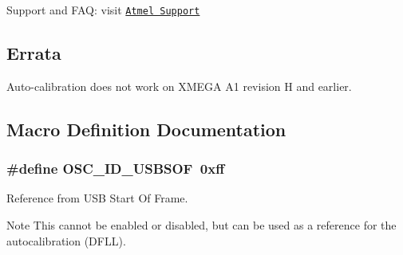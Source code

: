 Support and F\-A\-Q\-: visit \href{http://www.atmel.com/design-support/}{\tt Atmel Support}\hypertarget{group__osc__group_osc_group_errata}{}\subsection{Errata}\label{group__osc__group_osc_group_errata}

\begin{DoxyItemize}
\item Auto-\/calibration does not work on X\-M\-E\-G\-A A1 revision H and earlier. 
\end{DoxyItemize}

\subsection{Macro Definition Documentation}
\hypertarget{group__osc__group_ga31d93aece1229930bd2934a2ff26abdd}{
\subsubsection[{O\-S\-C\-\_\-\-I\-D\-\_\-\-U\-S\-B\-S\-O\-F}]{\setlength{\rightskip}{0pt plus 5cm}\#define O\-S\-C\-\_\-\-I\-D\-\_\-\-U\-S\-B\-S\-O\-F~0xff}}\label{group__osc__group_ga31d93aece1229930bd2934a2ff26abdd}


Reference from U\-S\-B Start Of Frame. 

\begin{DoxyNote}{Note}
This cannot be enabled or disabled, but can be used as a reference for the autocalibration (D\-F\-L\-L). 
\end{DoxyNote}
